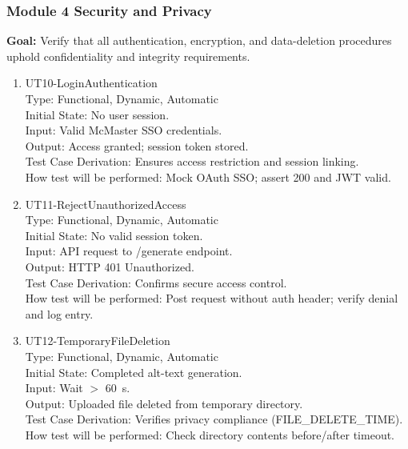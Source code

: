 \documentclass[12pt, titlepage]{article}
\begin{document}
\subsubsection{Module 4 \textemdash{} Security and Privacy}

\textbf{Goal:} Verify that all authentication, encryption, and
data-deletion procedures uphold confidentiality and integrity requirements.

\begin{enumerate}
  \item{UT10-LoginAuthentication\\}
    Type: Functional, Dynamic, Automatic\\
    Initial State: No user session.\\
    Input: Valid McMaster SSO credentials.\\
    Output: Access granted; session token stored.\\
    Test Case Derivation: Ensures access restriction and session linking.\\
    How test will be performed: Mock OAuth SSO; assert 200 and JWT valid.

  \item{UT11-RejectUnauthorizedAccess\\}
    Type: Functional, Dynamic, Automatic\\
    Initial State: No valid session token.\\
    Input: API request to /generate endpoint.\\
    Output: HTTP 401 Unauthorized.\\
    Test Case Derivation: Confirms secure access control.\\
    How test will be performed: Post request without auth header;
    verify denial and log entry.

  \item{UT12-TemporaryFileDeletion\\}
    Type: Functional, Dynamic, Automatic\\
    Initial State: Completed alt-text generation.\\
    Input: Wait $>$ 60~s.\\
    Output: Uploaded file deleted from temporary directory.\\
    Test Case Derivation: Verifies privacy compliance (FILE\_DELETE\_TIME).\\
    How test will be performed: Check directory contents before/after timeout.
\end{enumerate}
\end{document}
